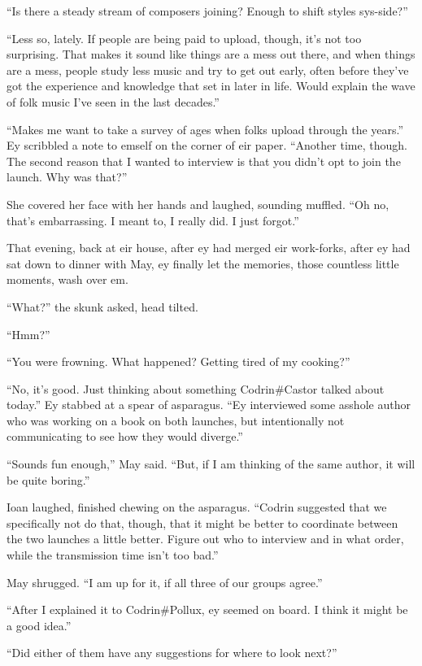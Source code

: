 ``Is there a steady stream of composers joining? Enough to shift styles sys-side?''

``Less so, lately. If people are being paid to upload, though, it's not too surprising. That makes it sound like things are a mess out there, and when things are a mess, people study less music and try to get out early, often before they've got the experience and knowledge that set in later in life. Would explain the wave of folk music I've seen in the last decades.''

``Makes me want to take a survey of ages when folks upload through the years.'' Ey scribbled a note to emself on the corner of eir paper. ``Another time, though. The second reason that I wanted to interview is that you didn't opt to join the launch. Why was that?''

She covered her face with her hands and laughed, sounding muffled. ``Oh no, that's embarrassing. I meant to, I really did. I just forgot.''

That evening, back at eir house, after ey had merged eir work-forks, after ey had sat down to dinner with May, ey finally let the memories, those countless little moments, wash over em.

``What?'' the skunk asked, head tilted.

``Hmm?''

``You were frowning. What happened? Getting tired of my cooking?''

``No, it's good. Just thinking about something Codrin\#Castor talked about today.'' Ey stabbed at a spear of asparagus. ``Ey interviewed some asshole author who was working on a book on both launches, but intentionally not communicating to see how they would diverge.''

``Sounds fun enough,'' May said. ``But, if I am thinking of the same author, it will be quite boring.''

Ioan laughed, finished chewing on the asparagus. ``Codrin suggested that we specifically not do that, though, that it might be better to coordinate between the two launches a little better. Figure out who to interview and in what order, while the transmission time isn't too bad.''

May shrugged. ``I am up for it, if all three of our groups agree.''

``After I explained it to Codrin\#Pollux, ey seemed on board. I think it might be a good idea.''

``Did either of them have any suggestions for where to look next?''

